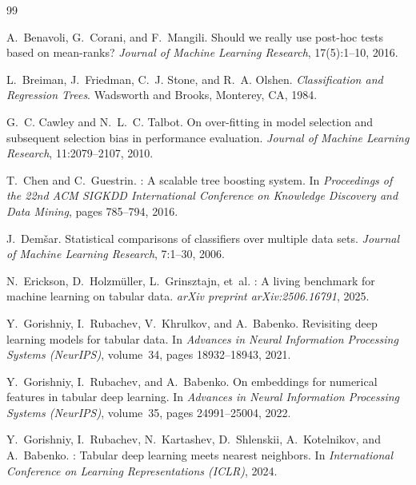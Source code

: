 \documentclass[11pt,a4paper]{article}
\begin{document}
\begin{thebibliography}{99}

A.~Benavoli, G.~Corani, and F.~Mangili.
\newblock Should we really use post-hoc tests based on mean-ranks?
\newblock \emph{Journal of Machine Learning Research}, 17(5):1--10, 2016.

L.~Breiman, J.~Friedman, C.~J. Stone, and R.~A. Olshen.
\newblock \emph{Classification and Regression Trees}.
\newblock Wadsworth and Brooks, Monterey, CA, 1984.

G.~C. Cawley and N.~L.~C. Talbot.
\newblock On over-fitting in model selection and subsequent selection bias in performance evaluation.
\newblock \emph{Journal of Machine Learning Research}, 11:2079--2107, 2010.

T.~Chen and C.~Guestrin.
: A scalable tree boosting system.
\newblock In \emph{Proceedings of the 22nd ACM SIGKDD International Conference on Knowledge Discovery and Data Mining}, pages 785--794, 2016.

J.~Dem\v{s}ar.
\newblock Statistical comparisons of classifiers over multiple data sets.
\newblock \emph{Journal of Machine Learning Research}, 7:1--30, 2006.

N.~Erickson, D.~Holzm\"{u}ller, L.~Grinsztajn, et~al.
: A living benchmark for machine learning on tabular data.
\newblock \emph{arXiv preprint arXiv:2506.16791}, 2025.

Y.~Gorishniy, I.~Rubachev, V.~Khrulkov, and A.~Babenko.
\newblock Revisiting deep learning models for tabular data.
\newblock In \emph{Advances in Neural Information Processing Systems (NeurIPS)}, volume~34, pages 18932--18943, 2021.

Y.~Gorishniy, I.~Rubachev, and A.~Babenko.
\newblock On embeddings for numerical features in tabular deep learning.
\newblock In \emph{Advances in Neural Information Processing Systems (NeurIPS)}, volume~35, pages 24991--25004, 2022.

Y.~Gorishniy, I.~Rubachev, N.~Kartashev, D.~Shlenskii, A.~Kotelnikov, and A.~Babenko.
: Tabular deep learning meets nearest neighbors.
\newblock In \emph{International Conference on Learning Representations (ICLR)}, 2024.


\end{thebibliography}
\end{document}
